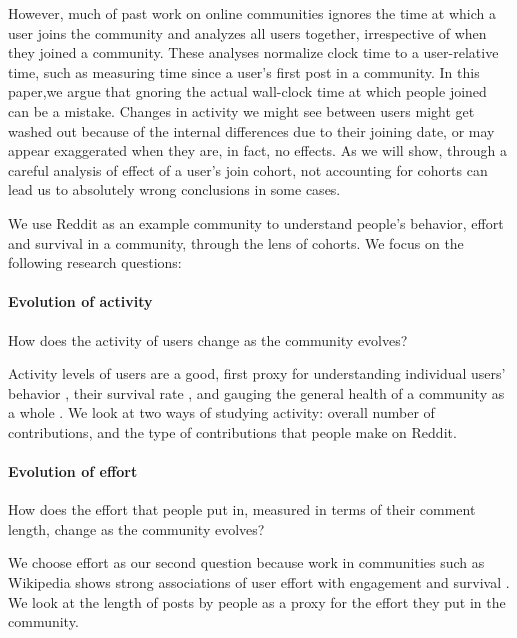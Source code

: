 However, much of past work on online communities ignores the time at which a user joins the community and analyzes all users together, irrespective of when they joined a community. These  analyses normalize clock time to a user-relative time, such as measuring time since a user's first post in a community. In this paper,we argue that gnoring the actual wall-clock time at which people joined can be a mistake. Changes in activity we might see between users might get washed out because of the internal differences due to their joining date, or may appear exaggerated when they are, in fact, no effects. As we will show, through a careful analysis of effect of a user's join cohort, not accounting for cohorts can lead us to absolutely wrong conclusions in some cases. 

We use Reddit as an example community to understand people's behavior, effort and survival in a community, through the lens of cohorts. We focus on the following research questions:

\paragraph*{Evolution of activity} How does the activity of users change as the community evolves?

Activity levels of users are a good, first proxy for understanding individual users' behavior \cite{}, their survival rate \cite{}, and  gauging the general health of a community as a whole \cite{}. We look at two ways of studying activity: overall number of contributions, and the type of contributions that people make on Reddit.

\paragraph*{Evolution of effort} How does the effort that people put in, measured in terms of their comment length, change as the community evolves?
 
We choose effort as our second question because work in communities such as Wikipedia shows strong associations of user effort with engagement and survival \cite{}.  We look at the length of posts by people as a proxy for the effort they put in the community. 


